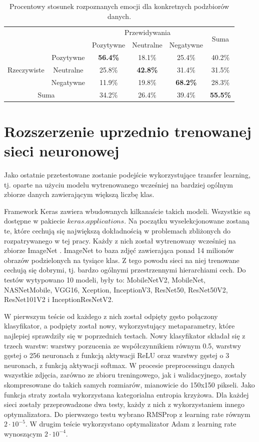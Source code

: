 \begin{table}[H]
  \centering
  \caption{Procentowy stosunek rozpoznanych emocji dla konkretnych podzbiorów danych.}
    \begin{tabular}{ |cc|ccc|c| }
    \hline
    && \multicolumn{3}{c|}{Przewidywania} & \multirow{2}{*}{Suma} \\
    && Pozytywne & Neutralne & \multicolumn{1}{c|}{Negatywne} & \\
    \hline
    \multirow{3}{*}{Rzeczywiste} & Pozytywne & \textbf{56.4\%} & 18.1\% & 25.4\% & 40.2\% \\
    & Neutralne & 25.8\% & \textbf{42.8\%} & 31.4\% & 31.5\% \\
    & Negatywne & 11.9\% & 19.8\% & \textbf{68.2\%} & 28.3\% \\
    \hline
    \multicolumn{2}{|c|}{Suma} & 34.2\% & 26.4\% & 39.4\% & \textbf{55.5\%}\\
    \hline
    \end{tabular}
  \label{tab:5.11}
\end{table}


\section{Rozszerzenie uprzednio trenowanej sieci neuronowej}
Jako ostatnie przetestowane zostanie podejście wykorzystujące transfer learning, tj. oparte na użyciu modelu wytrenowanego wcześniej na bardziej ogólnym zbiorze danych zawierającym większą liczbę klas.

Framework Keras zawiera wbudowanych kilkanaście takich modeli. Wszystkie są dostępne w pakiecie $keras.applications$. Na początku wyselekcjonowane zostaną te, które cechują się największą dokładnością w problemach zbliżonych do rozpatrywanego w tej pracy. Każdy z nich został wytrenowany wcześniej na zbiorze ImageNet \cite{ImageNet}. ImageNet to baza zdjęć zawierająca ponad 14 milionów obrazów podzielonych na tysiące klas. Z tego powodu sieci na niej trenowane cechują się dobrymi, tj. bardzo ogólnymi przestrzennymi hierarchiami cech. Do testów wytypowano 10 modeli, były to: MobileNetV2, MobileNet, NASNetMobile, VGG16, Xception, InceptionV3, ResNet50, ResNet50V2, ResNet101V2 i InceptionResNetV2.

W pierwszym teście od każdego z nich został odpięty gęsto połączony klasyfikator, a podpięty został nowy, wykorzystujący metaparametry, które najlepiej sprawdziły się w poprzednich testach. Nowy klasyfikator składał się z trzech warstw: warstwy porzucenia ze współczynnikiem równym 0.5, warstwy gęstej o 256 neuronach z funkcją aktywacji ReLU oraz warstwy gęstej o 3 neuronach, z funkcją aktywacji softmax. W procesie preprocessingu danych wszystkie zdjęcia, zarówno ze zbioru treningowego, jak i walidacyjnego, zostały skompresowane do takich samych rozmiarów, mianowicie do 150x150 pikseli. Jako funkcja straty została wykorzystana kategorialna entropia krzyżowa. Dla każdej sieci zostały przeprowadzone dwa testy, każdy z nich z wykorzystaniem innego optymalizatora. Do pierwszego testu wybrano RMSProp z learning rate równym $2\cdot10^{-5}$. W drugim teście wykorzystano optymalizator Adam z learning rate wynoszącym $2\cdot10^{-4}$.

